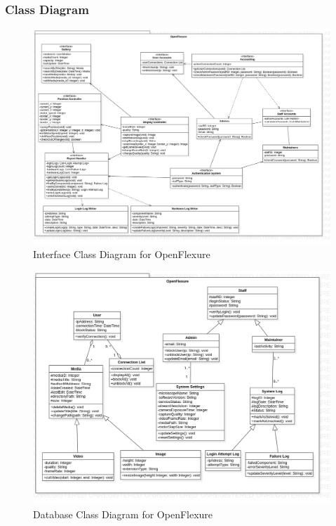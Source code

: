 \subsubsection{Class Diagram}

\begin{figure}[H]
	\centering
	\includegraphics[scale=0.3]{Uml_Images/interface_class_diagram}
	\caption{Interface Class Diagram for OpenFlexure}
	\label{fig:interface_class_diagram}
\end{figure}



\begin{figure}[H]
	\centering
	\includegraphics[scale=0.4]{Uml_Images/db_class_diagram}
	\caption{Database Class Diagram for OpenFlexure}
	\label{fig:db_class_diagram}
\end{figure}

